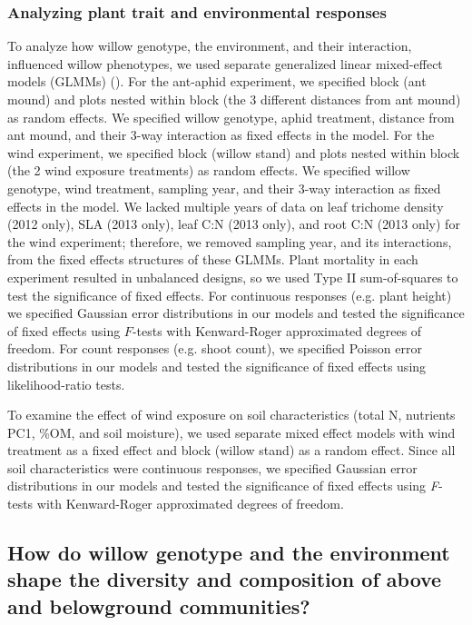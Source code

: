 \documentclass[11pt]{article}
\begin{document}
\subsubsection*{Analyzing plant trait and environmental responses}

To analyze how willow genotype, the environment, and their interaction, influenced willow phenotypes, we used separate generalized linear mixed-effect models
(GLMMs) (\citealt{Bolker_2009}). For the ant-aphid experiment, we specified block (ant mound) and plots
nested within block (the 3 different distances from ant mound) as random
effects. We specified willow genotype, aphid treatment, distance from
ant mound, and their 3-way interaction as fixed effects in the model.
For the wind experiment, we specified block (willow stand) and plots
nested within block (the 2 wind exposure treatments) as random effects.
We specified willow genotype, wind treatment, sampling year, and their
3-way interaction as fixed effects in the model. We lacked multiple years of data on leaf trichome density (2012 only), SLA (2013 only), leaf C:N (2013 only), and root C:N (2013 only) for the wind experiment; therefore, we removed sampling year, and its interactions, from the fixed effects structures of these GLMMs. Plant mortality in each
experiment resulted in unbalanced designs, so we used Type II
sum-of-squares to test the significance of fixed effects. For continuous
responses (e.g. plant height) we specified Gaussian error distributions
in our models and tested the significance of fixed effects using $F$-tests
with Kenward-Roger approximated degrees of freedom. For count responses
(e.g. shoot count), we specified Poisson error
distributions in our models and tested the significance of fixed effects
using likelihood-ratio tests. %

To examine the effect of wind exposure on soil characteristics (total N,
nutrients PC1, \%OM, and soil moisture), we used separate mixed effect
models with wind treatment as a fixed effect and block (willow stand) as
a random effect. Since all soil characteristics were continuous
responses, we specified Gaussian error distributions in our models and
tested the significance of fixed effects using \emph{F}-tests with
Kenward-Roger approximated degrees of freedom.

\subsection*{How do willow genotype and the environment shape the diversity and composition of above and belowground communities?}
\end{document}
